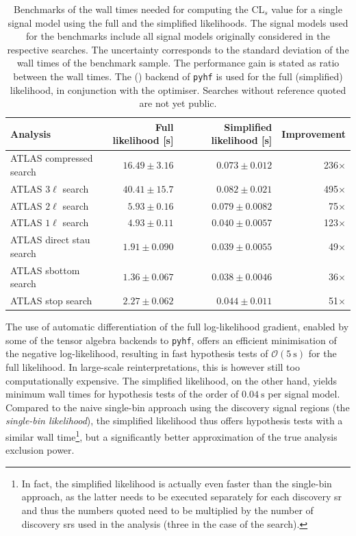 \begin{table}
	\begin{center}
	\small
			\begin{tabular} {l r r r}
				\toprule
				Analysis & Full likelihood [s] & Simplified likelihood [s] & Improvement \\
				\midrule
				ATLAS compressed search~\cite{SUSY-2018-16} & $16.49\pm 3.16$ & $0.073 \pm 0.012$ & 236$\times$ \\
				ATLAS $3\ell$ search & $40.41 \pm 15.7$ & $0.082 \pm 0.021$ & 495$\times$\\
				ATLAS $2\ell$ search~\cite{SUSY-2018-32} & $5.93 \pm 0.16$ & $0.079 \pm 0.0082$ & 75$\times$\\
				ATLAS $1\ell$ search~\cite{SUSY-2019-08} & $4.93 \pm 0.11$ & $0.040 \pm 0.0057$ & 123$\times$ \\
				ATLAS direct stau search~\cite{SUSY-2018-04} & $1.91 \pm 0.090$ & $0.039 \pm 0.0055$ & 49$\times$\\
				ATLAS sbottom search~\cite{SUSY-2018-31} & $1.36 \pm 0.067$ & $0.038 \pm 0.0046$ & 36$\times$ \\
				ATLAS stop search & $2.27 \pm 0.062$ & $0.044 \pm 0.011$ & 51$\times$\\
				\bottomrule
			\end{tabular}
		\caption{Benchmarks of the wall times needed for computing the CL$_s$ value for a single signal model using the full and the simplified likelihoods. The signal models used for the benchmarks include all signal models originally considered in the respective searches. The uncertainty corresponds to the standard deviation of the wall times of the benchmark sample. The performance gain is stated as ratio between the wall times. The  () backend of \texttt{pyhf} is used for the full (simplified) likelihood, in conjunction with the  optimiser. Searches without reference quoted are not yet public.}
		\label{tab:simplified_performance}
	\end{center}
\end{table}

The use of automatic differentiation of the full log-likelihood gradient, enabled by some of the tensor algebra backends to \texttt{pyhf}, offers an efficient minimisation of the negative log-likelihood, resulting in fast hypothesis tests of $\mathcal{O}(\SI{5}{\second})$ for the full likelihood.
In large-scale reinterpretations, this is however still too computationally expensive.
The simplified likelihood, on the other hand, yields minimum wall times for hypothesis tests of the order of $\SI{0.04}{\second}$ per signal model.
Compared to the naive single-bin approach using the discovery signal regions (the \textit{single-bin likelihood}), the simplified likelihood thus offers hypothesis tests with a similar wall time\footnote{In fact, the simplified likelihood is actually even faster than the single-bin approach, as the latter needs to be executed separately for each discovery \gls{sr} and thus the numbers quoted need to be multiplied by the number of discovery \glspl{sr} used in the analysis (three in the case of the \onelepton search).}, but a significantly better approximation of the true analysis exclusion power.

